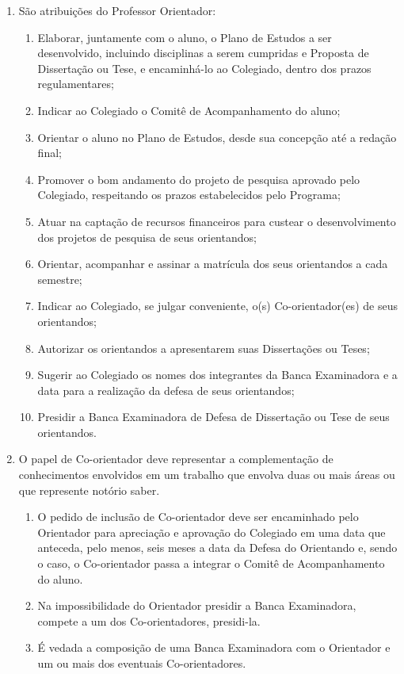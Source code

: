 \documentclass{article}
\begin{document}
\begin{enumerate}
	\item  São atribuições do Professor Orientador:
	\begin{enumerate}[label=\Roman*]
		\item Elaborar, juntamente com o aluno, o Plano de Estudos a ser desenvolvido, incluindo disciplinas a serem cumpridas e Proposta de Dissertação ou Tese, e encaminhá-lo ao Colegiado, dentro dos prazos regulamentares;
		\item	Indicar ao Colegiado o Comitê de Acompanhamento do aluno;
		\item	Orientar o aluno no Plano de Estudos, desde sua concepção até a redação final;
		\item	Promover o bom andamento do projeto de pesquisa aprovado pelo Colegiado, respeitando os prazos estabelecidos pelo Programa;
		\item	Atuar na captação de recursos financeiros para custear o desenvolvimento dos projetos de pesquisa de seus orientandos;
		\item	Orientar, acompanhar e assinar a matrícula dos seus orientandos a cada semestre;
		\item	Indicar ao Colegiado, se julgar conveniente, o(s) Co-orientador(es) de seus orientandos;
		\item	Autorizar os orientandos a apresentarem suas Dissertações ou Teses;
		\item	Sugerir ao Colegiado os nomes dos integrantes da Banca Examinadora e a data para a realização da defesa de seus orientandos;
		\item	Presidir a Banca Examinadora de Defesa de Dissertação ou Tese de seus orientandos.
	\end{enumerate}

	\item O papel de Co-orientador deve representar a complementação de conhecimentos envolvidos em um trabalho que envolva duas ou mais áreas ou que represente notório saber.
	\begin{enumerate}
		\item O pedido de inclusão de Co-orientador deve ser encaminhado pelo Orientador para apreciação e aprovação do Colegiado em uma data que anteceda, pelo menos, seis meses a data da Defesa do Orientando e, sendo o caso, o Co-orientador passa a integrar o Comitê de Acompanhamento do aluno.
		\item Na impossibilidade do Orientador presidir a Banca Examinadora, compete a um dos Co-orientadores, presidi-la.
		\item É vedada a composição de uma Banca Examinadora com o Orientador e um ou mais dos eventuais Co-orientadores.
	\end{enumerate}


\end{enumerate}
\end{document}
